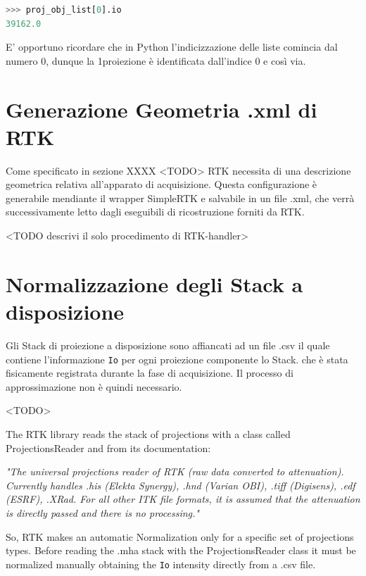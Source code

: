 \documentclass[a4paper,11pt, oneside]{article}
\begin{document}
            \begin{lstlisting}[language=python, frame=bt]
>>> proj_obj_list[0].io
39162.0
            \end{lstlisting}
            
            E' opportuno ricordare che in Python l'indicizzazione delle liste comincia dal numero 0, dunque la 1\degree proiezione è identificata dall'indice 0 e così via.
            
        \section{Generazione Geometria .xml di RTK}
            Come specificato in sezione XXXX <TODO> RTK necessita di una descrizione geometrica relativa all'apparato di acquisizione. Questa configurazione è generabile mendiante il wrapper SimpleRTK e salvabile in un file .xml, che verrà successivamente letto dagli eseguibili di ricostruzione forniti da RTK.
            
            <TODO descrivi il solo procedimento di RTK-handler>
        
        
        \section{Normalizzazione degli Stack a disposizione}
            
            \par
                Gli Stack di proiezione a disposizione sono affiancati ad un file .csv il quale contiene l'informazione \texttt{Io} per ogni proiezione componente lo Stack. che è stata fisicamente registrata durante la fase di acquisizione. Il processo di approssimazione non è quindi necessario.
                
                <TODO>
                
                The RTK library reads the stack of projections with a class called ProjectionsReader and from its documentation:
                  \par \textit{"The universal projections reader of RTK (raw data converted to attenuation). Currently handles .his (Elekta Synergy), .hnd (Varian OBI), .tiff (Digisens), .edf (ESRF), .XRad. For all other ITK file formats, it is assumed that the attenuation is directly passed and there is no processing."\newline}
                  \par So, RTK makes an automatic Normalization only for a specific set of projections types. Before reading the .mha stack with the ProjectionsReader class it must be normalized manually obtaining the \texttt{Io} intensity directly from a .csv file.\newline
                   
\end{document}
